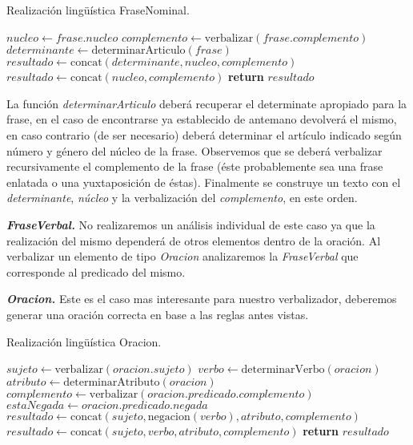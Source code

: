 \begin{algorithm}[H]
\caption{Realización lingüística FraseNominal.}
\begin{algorithmic}[1]
\State $nucleo\gets frase.nucleo$
\State $complemento\gets \text{verbalizar}(frase.complemento)$
\State $determinante\gets \text{determinarArticulo}(frase)$
\State $resultado\gets \text{concat}(determinante, nucleo, complemento)$
\Else
\State $resultado\gets \text{concat}(nucleo, complemento)$
\EndIf
\Statex
\State \textbf{return} $resultado$
\EndFunction
\end{algorithmic}
\end{algorithm}

\noindent
La función \emph{determinarArticulo} deberá recuperar el determinate apropiado para la frase, en el caso de encontrarse ya establecido de antemano devolverá el mismo, en caso contrario (de ser necesario) deberá determinar el artículo indicado según número y género del núcleo de la frase. Observemos que se deberá verbalizar recursivamente el complemento de la frase (éste probablemente sea una frase enlatada o una yuxtaposición de éstas). Finalmente se construye un texto con el \emph{determinante}, \emph{núcleo} y la verbalización del \emph{complemento}, en este orden.

\medskip
\noindent
\textbf{\emph{FraseVerbal.}} No realizaremos un análisis individual de este caso ya que la realización del mismo dependerá de otros elementos dentro de la oración. Al verbalizar un elemento de tipo \emph{Oracion} analizaremos la \emph{FraseVerbal} que corresponde al predicado del mismo.


\medskip
\noindent
\textbf{\emph{Oracion.}} Este es el caso mas interesante para nuestro verbalizador, deberemos generar una oración correcta en base a las reglas antes vistas. 

\begin{algorithm}[H]
\caption{Realización lingüística Oracion.}
\begin{algorithmic}[1]
\State $sujeto\gets \text{verbalizar}(oracion.sujeto)$
\State $verbo\gets \text{determinarVerbo}(oracion)$
\State $atributo\gets \text{determinarAtributo}(oracion)$
\State $complemento\gets \text{verbalizar}(oracion.predicado.complemento)$
\State $estaNegada\gets oracion.predicado.negada$
\Statex
{}
\State $resultado\gets \text{concat}(sujeto, \text{negacion}(verbo), atributo, complemento)$
\Else
\State $resultado\gets \text{concat}(sujeto, verbo, atributo, complemento)$
\EndIf
\Statex
\State \textbf{return} $resultado$
\EndFunction
\end{algorithmic}
\end{algorithm}

